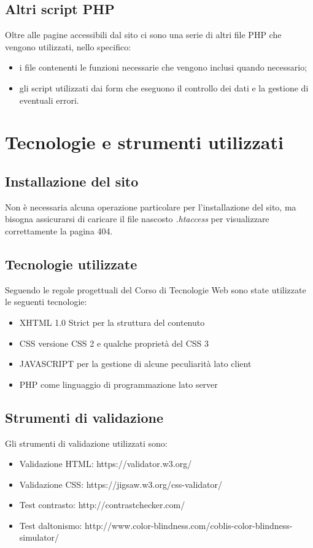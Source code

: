 \documentclass[10pt,a4paper,onecolumn]{article}
\begin{document}
\subsection{Altri script PHP}
Oltre alle pagine accessibili dal sito ci sono una serie di altri file PHP che vengono utilizzati, nello specifico:
\begin{itemize}
    \item i file contenenti le funzioni necessarie che vengono inclusi quando necessario;
    \item gli script utilizzati dai form che eseguono il controllo dei dati e la gestione di eventuali errori.
\end{itemize}
\clearpage
\section{Tecnologie e strumenti utilizzati}

\subsection{Installazione del sito}
Non è necessaria alcuna operazione particolare per l'installazione del sito, ma bisogna assicurarsi di caricare il file nascosto \textit{.htaccess} per visualizzare correttamente la pagina 404.

\subsection{Tecnologie utilizzate}
Seguendo le regole progettuali del Corso di Tecnologie Web sono state utilizzate le seguenti tecnologie: \begin{itemize}
\item XHTML 1.0 Strict per la struttura del contenuto
\item CSS versione CSS 2 e qualche proprietà del CSS 3
\item JAVASCRIPT per la gestione di alcune peculiarità lato client
\item PHP come linguaggio di programmazione lato server
\end{itemize}

\subsection{Strumenti di validazione}
Gli strumenti di validazione utilizzati sono:
\begin{itemize}
\item Validazione HTML: https://validator.w3.org/
\item Validazione CSS: https://jigsaw.w3.org/css-validator/
\item Test contrasto: http://contrastchecker.com/
\item Test daltonismo: http://www.color-blindness.com/coblis-color-blindness-simulator/
\end{itemize}
\end{document}
